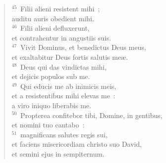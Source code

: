 \begin{flushleft}
\begin{verse}
${}^{45}$~Filii alieni resistent mihi~;\\ auditu auris obedient mihi.\\
${}^{46}$~Filii alieni defluxerunt,\\ et contrahentur in angustiis suis.\\
${}^{47}$~Vivit Dominus, et benedictus Deus meus,\\ et exaltabitur Deus fortis salutis me\ae .\\
${}^{48}$~Deus qui das vindictas mihi,\\ et dejicis populos sub me.\\
${}^{49}$~Qui educis me ab inimicis meis,\\ et a resistentibus mihi elevas me~:\\ a viro iniquo liberabis me.\\
${}^{50}$~Propterea confitebor tibi, Domine, in gentibus,\\ et nomini tuo cantabo~:\\
${}^{51}$~magnificans salutes regis sui,\\ et faciens misericordiam christo suo David,\\ et semini ejus in sempiternum.\end{verse}\end{flushleft}


